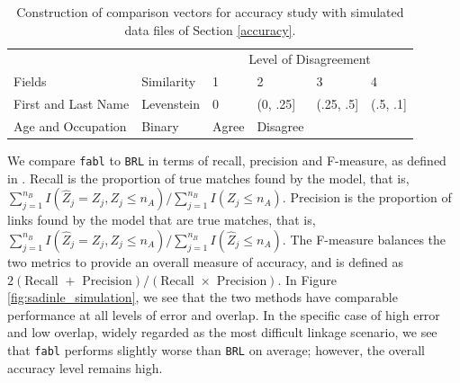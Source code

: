 \documentclass[ba]{imsart}
\begin{document}
	\begin{table}[t]
		\centering
		\begin{tabular}[t]{llllll}
			
			\multicolumn{2}{c}{ } & \multicolumn{4}{c}{Level of Disagreement} \\
			\cline{3-6}
			Fields & Similarity & 1 & 2 & 3 & 4\\
			\hline
			First and Last Name & Levenstein & 0 & (0, .25] & (.25, .5] & (.5, .1]\\
			Age and Occupation & Binary & Agree & Disagree &  & \\
			\hline
		\end{tabular}
		\caption{Construction of comparison vectors for accuracy study with simulated data files of Section \ref{accuracy}.}
		\label{Tab:sadinle_simulation_cutoffs}
	\end{table}
	
	We compare \texttt{fabl} to \texttt{BRL} in terms of recall, precision and F-measure, as defined in \cite{christen_2012}. Recall is the proportion of true matches found by the model, that is, $\sum_{j=1}^{n_B} I(\hat{Z}_j = Z_j, Z_j \leq n_A) / \sum_{j=1}^{n_B} I(Z_j \leq n_A)$. Precision is the proportion of links found by the model that are true matches, that is, $\sum_{j=1}^{n_B} I(\hat{Z}_j = Z_j, Z_j \leq n_A) / \sum_{j=1}^{n_B} I(\hat{Z}_j \leq n_A)$. The F-measure balances the two metrics to provide an overall measure of accuracy, and is defined as $2  (\text{Recall } + \text{ Precision}) / (\text{Recall } \times \text{ Precision})$. In Figure \ref{fig:sadinle_simulation}, we see that the two methods have comparable performance at all levels of error and overlap. In the specific case of high error and low overlap, widely regarded as the most difficult linkage scenario, we see that \texttt{fabl} performs slightly worse than \texttt{BRL} on average; however, the overall accuracy level remains high. 
	
\end{document}
